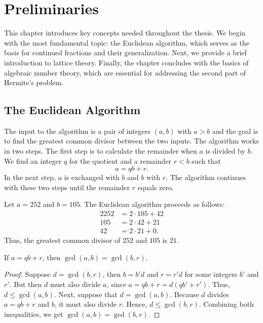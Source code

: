 \chapter{Preliminaries}
\label{ch:preliminaries}

This chapter introduces key concepts needed throughout the thesis.
We begin with the most fundamental topic: the Euclidean algorithm,
which serves as the basis for continued fractions and their generalization.
Next, we provide a brief introduction to lattice theory.
Finally, the chapter concludes with the basics of algebraic number theory,
which are essential for addressing the second part of Hermite's problem.

\section{The Euclidean Algorithm}

The input to the algorithm is a pair of integers $(a, b)$ with $a > b$ and the
goal is to find the greatest common divisor between the two inputs.
The algorithm works in two steps.
The first step is to calculate the remainder when $a$ is divided by $b$.
We find an integer $q$ for the quotient and a remainder $r < b$ such that
\[
  a = q b + r.
\]
In the next step, $a$ is exchanged with $b$ and $b$ with $r$.
The algorithm continues with these two steps until the remainder $r$ equals zero.

\begin{example}
  Let $a = 252$ and $b = 105$.
  The Euclidean algorithm proceeds as follows:
  \begin{alignat*}{2}
    252 & = 2 · 105 + 42 \\
    105 & = 2 · 42 + 21 \\
    42 & = 2 · 21 + 0.
  \end{alignat*}
  Thus, the greatest common divisor of $252$ and $105$ is $21$.
\end{example}

\begin{lemma}
  If $a = qb + r$, then $\gcd(a, b) = \gcd(b, r)$.
\end{lemma}

\begin{proof}
  Suppose $d = \gcd(b, r)$, then $b = b'd$ and $r = r'd$ for some integers $b'$ and $r'$.
  But then $d$ must also divide $a$, since $a = qb + r = d(qb' + r')$.
  Thus, $d ≤ \gcd(a, b)$.
  Next, suppose that $d = \gcd(a, b)$.
  Because $d$ divides $a = qb + r$ and $b$,
  it must also divide $r$.
  Hence, $d ≤ \gcd(b, r)$.
  Combining both inequalities, we get $\gcd(a, b) = \gcd(b, r)$.
\end{proof}


